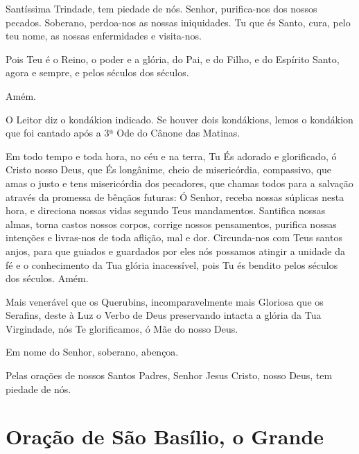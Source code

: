 \documentclass{subfiles}
\begin{document}
\trisagion{} \thrice{}

\Doxology{}

Santíssima Trindade, tem piedade de nós. Senhor, purifica-nos dos
nossos pecados. Soberano, perdoa-nos as nossas iniquidades. Tu que és Santo,
cura, pelo teu nome, as nossas enfermidades e visita-nos.

\mercy{} \thrice{}

\Doxology{}

\ourFather{}

\priest{}Pois Teu é o Reino, o poder e a glória, do Pai, e do Filho, e do
Espírito Santo, agora e sempre, e pelos séculos dos séculos.

\reader{}Amém.

O Leitor diz o kondákion indicado. Se houver dois kondákions, lemos o
kondákion que foi cantado após a 3ª Ode do Cânone das Matinas.

\mercy{} 

Em todo tempo e toda hora, no céu e na terra, Tu És adorado e
glorificado, ó Cristo nosso Deus, que És longânime, cheio de misericórdia,
compassivo, que amas o justo e tens misericórdia dos pecadores, que chamas
todos para a salvação através da promessa de bênçãos futuras: Ó Senhor,
receba nossas súplicas nesta hora, e direciona nossas vidas segundo Teus
mandamentos. Santifica nossas almas, torna castos nossos corpos, corrige
nossos pensamentos, purifica nossas intenções e livras-nos de toda aflição,
mal e dor. Circunda-nos com Teus santos anjos, para que guiados e guardados
por eles nós possamos atingir a unidade da fé e o conhecimento da Tua glória
inacessível, pois Tu és bendito pelos séculos dos séculos. Amém.

\mercy{} \thrice{}

\Doxology{}

Mais venerável que os Querubins, incomparavelmente mais Gloriosa
que os Serafins, deste à Luz o Verbo de Deus preservando intacta a glória da
Tua Virgindade, nós Te glorificamos, ó Mãe do nosso Deus.

\Doxology{}

\mercy{} \thrice{}

Em nome do Senhor, soberano, abençoa.

\priest{}Pelas orações de nossos Santos Padres, Senhor Jesus Cristo,
nosso Deus, tem piedade de nós.

\section*{Oração de São Basílio, o Grande}
\end{document}
